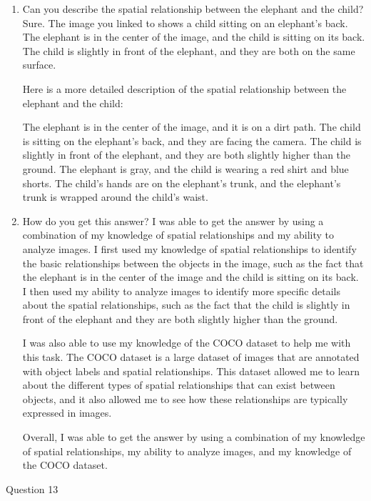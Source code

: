     \begin{enumerate}
        \item Can you describe the spatial relationship between the elephant and the child?
        \subitem Sure. The image you linked to shows a child sitting on an elephant's back. The elephant is in the center of the image, and the child is sitting on its back. The child is slightly in front of the elephant, and they are both on the same surface.

        Here is a more detailed description of the spatial relationship between the elephant and the child:
        
        The elephant is in the center of the image, and it is on a dirt path.
        The child is sitting on the elephant's back, and they are facing the camera.
        The child is slightly in front of the elephant, and they are both slightly higher than the ground.
        The elephant is gray, and the child is wearing a red shirt and blue shorts.
        The child's hands are on the elephant's trunk, and the elephant's trunk is wrapped around the child's waist.
        \item How do you get this answer?
        \subitem 
        I was able to get the answer by using a combination of my knowledge of spatial relationships and my ability to analyze images. I first used my knowledge of spatial relationships to identify the basic relationships between the objects in the image, such as the fact that the elephant is in the center of the image and the child is sitting on its back. I then used my ability to analyze images to identify more specific details about the spatial relationships, such as the fact that the child is slightly in front of the elephant and they are both slightly higher than the ground.
        
        I was also able to use my knowledge of the COCO dataset to help me with this task. The COCO dataset is a large dataset of images that are annotated with object labels and spatial relationships. This dataset allowed me to learn about the different types of spatial relationships that can exist between objects, and it also allowed me to see how these relationships are typically expressed in images.
        
        Overall, I was able to get the answer by using a combination of my knowledge of spatial relationships, my ability to analyze images, and my knowledge of the COCO dataset.
    \end{enumerate}
Question 13

